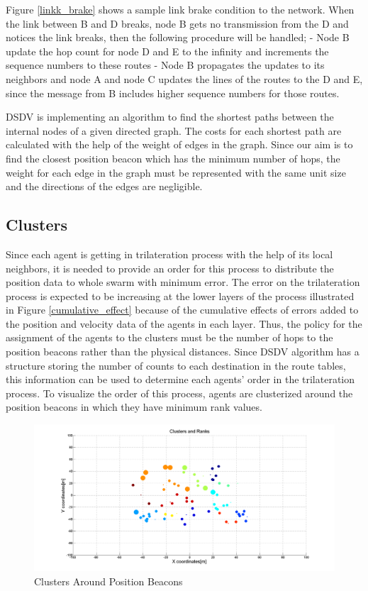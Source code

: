 Figure \ref{linkk_brake} shows a sample link brake condition to the network. When the link between B and D breaks, node B gets no transmission from the D and notices the link breaks, then the following procedure will be handled; \newline
	- Node B update the hop count for node D and E to the infinity and increments the sequence numbers to these routes \newline
	- Node B propagates the updates to its neighbors and node A and node C updates the lines of the routes to the D and E, since the message from B includes higher sequence numbers for those routes.
	
DSDV is implementing an algorithm to find the shortest paths between the internal nodes of a given directed graph. The costs for each shortest path are calculated with the help of the weight of edges in the graph. Since our aim is to find the closest position beacon which has the minimum number of hops, the weight for each edge in the graph must be represented with the same unit size and the directions of the edges are negligible. 

\subsection{Clusters} \label{Clusters}
Since each agent is getting in trilateration process with the help of its local neighbors, it is needed to provide an order for this process to distribute the position data to whole swarm with minimum error. The error on the trilateration process is expected to be increasing at the lower layers of the process illustrated in Figure \ref{cumulative_effect} because of the cumulative effects of errors added to the position and velocity data of the agents in each layer. Thus, the policy for the assignment of the agents to the clusters must be the number of hops to the position beacons rather than the physical distances. Since DSDV algorithm has a structure storing the number of counts to each destination in the route tables, this information can be used to determine each agents' order in the trilateration process. To visualize the order of this process, agents are clusterized around the position beacons in which they have minimum rank values.

\begin{figure}[H]
\caption{Clusters Around Position Beacons} \label{Clusters_Ranks_2_ref}
\centering
\includegraphics[scale = 0.27]{Clusters_Ranks_2}
\end{figure}

